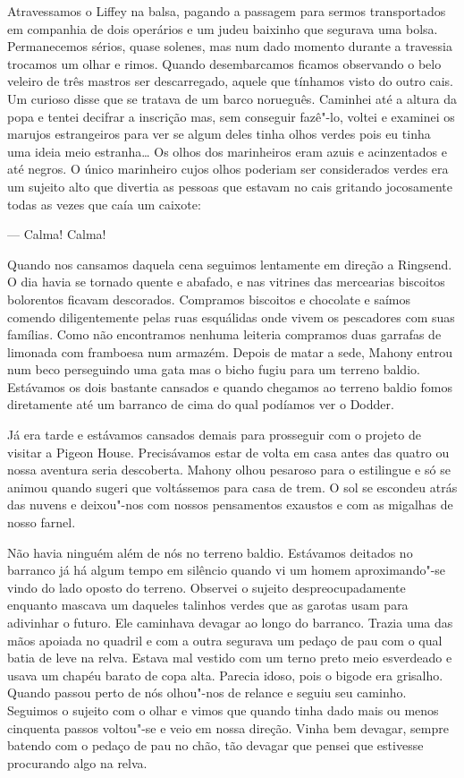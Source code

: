 Atravessamos o Liffey na balsa, pagando a passagem para sermos transportados em
companhia de dois operários e um judeu baixinho que segurava uma bolsa.
Permanecemos sérios, quase solenes, mas num dado momento durante a travessia
trocamos um olhar e rimos.  Quando desembarcamos ficamos observando o belo
veleiro de três mastros ser descarregado, aquele que tínhamos visto do outro
cais.  Um curioso disse que se tratava de um barco norueguês.  Caminhei até a
altura da popa e tentei decifrar a inscrição mas, sem conseguir fazê"-lo, voltei
e examinei os marujos estrangeiros para ver se algum deles tinha olhos verdes
pois eu tinha uma ideia meio estranha\ldots{} Os olhos dos marinheiros eram
azuis e acinzentados e até negros.  O único marinheiro cujos olhos poderiam ser
considerados verdes era um sujeito alto que divertia as pessoas que estavam no
cais gritando jocosamente todas as vezes que caía um caixote:

--- Calma!  Calma!

Quando nos cansamos daquela cena seguimos lentamente em direção a Ringsend.  O dia
havia se tornado quente e abafado, e nas vitrines das mercearias biscoitos
bolorentos ficavam descorados.  Compramos biscoitos e chocolate e saímos
comendo diligentemente pelas ruas esquálidas onde vivem os pescadores com suas
famílias.  Como não encontramos nenhuma leiteria compramos duas garrafas de
limonada com framboesa num armazém.  Depois de matar a sede, Mahony entrou num
beco perseguindo uma gata mas o bicho fugiu para um terreno baldio.  Estávamos
os dois bastante cansados e quando chegamos ao terreno baldio fomos diretamente
até um barranco de cima do qual podíamos ver o Dodder.

Já era tarde e estávamos cansados demais para prosseguir com o projeto de
visitar a Pigeon House.  Precisávamos estar de volta em casa antes das quatro
ou nossa aventura seria descoberta.  Mahony olhou pesaroso para o estilingue e
só se animou quando sugeri que voltássemos para casa de trem.  O sol se
escondeu atrás das nuvens e deixou"-nos com nossos pensamentos exaustos e com as
migalhas de nosso farnel.

Não havia ninguém além de nós no terreno baldio.  Estávamos deitados no
barranco já há algum tempo em silêncio quando vi um homem aproximando"-se vindo
do lado oposto do terreno.  Observei o sujeito despreocupadamente enquanto
mascava um daqueles talinhos verdes que as garotas usam para adivinhar o
futuro.  Ele caminhava devagar ao longo do barranco.  Trazia uma das mãos
apoiada no quadril e com a outra segurava um pedaço de pau com o qual batia de
leve na relva.  Estava mal vestido com um terno preto meio esverdeado e usava
um chapéu barato de copa alta.  Parecia idoso, pois o bigode era grisalho.
Quando passou perto de nós olhou"-nos de relance e seguiu seu caminho.  Seguimos
o sujeito com o olhar e vimos que quando tinha dado mais ou menos cinquenta
passos voltou"-se e veio em nossa direção.  Vinha bem devagar, sempre batendo
com o pedaço de pau no chão, tão devagar que pensei que estivesse procurando
algo na relva.

